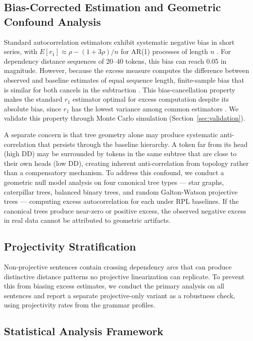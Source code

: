 \documentclass[11pt,letterpaper]{article}
\begin{document}
\subsection{Bias-Corrected Estimation and Geometric Confound Analysis}

Standard autocorrelation estimators exhibit systematic negative bias in short series, with $E[r_1] \approx \rho - (1 + 3\rho)/n$ for AR(1) processes of length $n$ \citep{Shaman1988}. For dependency distance sequences of 20--40 tokens, this bias can reach 0.05 in magnitude. However, because the excess measure computes the difference between observed and baseline estimates of equal sequence length, finite-sample bias that is similar for both cancels in the subtraction \citep{Krone2017, Dou2026}. This bias-cancellation property makes the standard $r_1$ estimator optimal for excess computation despite its absolute bias, since $r_1$ has the lowest variance among common estimators \citep{Krone2017}. We validate this property through Monte Carlo simulation (Section~\ref{sec:validation}).

A separate concern is that tree geometry alone may produce systematic anti-correlation that persists through the baseline hierarchy. A token far from its head (high DD) may be surrounded by tokens in the same subtree that are close to their own heads (low DD), creating inherent anti-correlation from topology rather than a compensatory mechanism. To address this confound, we conduct a geometric null model analysis on four canonical tree types --- star graphs, caterpillar trees, balanced binary trees, and random Galton-Watson projective trees --- computing excess autocorrelation for each under RPL baselines. If the canonical trees produce near-zero or positive excess, the observed negative excess in real data cannot be attributed to geometric artifacts.

\subsection{Projectivity Stratification}

Non-projective sentences contain crossing dependency arcs that can produce distinctive distance patterns no projective linearization can replicate. To prevent this from biasing excess estimates, we conduct the primary analysis on all sentences and report a separate projective-only variant as a robustness check, using projectivity rates from the grammar profiles.

\subsection{Statistical Analysis Framework}
\end{document}
